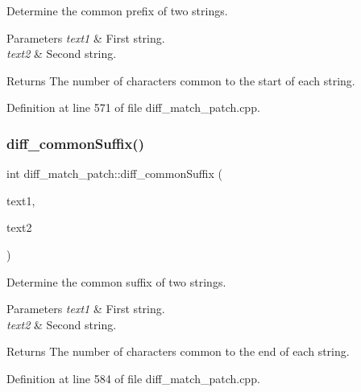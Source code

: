 Determine the common prefix of two strings. 
\begin{DoxyParams}{Parameters}
{\em text1} & First string. \\
\hline
{\em text2} & Second string. \\
\hline
\end{DoxyParams}
\begin{DoxyReturn}{Returns}
The number of characters common to the start of each string. 
\end{DoxyReturn}


Definition at line 571 of file diff\+\_\+match\+\_\+patch.\+cpp.

\mbox{\label{classdiff__match__patch_aed765d65d9e6fb78de3725416a262586}} 
\subsubsection{\texorpdfstring{diff\+\_\+common\+Suffix()}{diff\_commonSuffix()}}
{\footnotesize\ttfamily int diff\+\_\+match\+\_\+patch\+::diff\+\_\+common\+Suffix (\begin{DoxyParamCaption}\item[{const Q\+String \&}]{text1,  }\item[{const Q\+String \&}]{text2 }\end{DoxyParamCaption})}

Determine the common suffix of two strings. 
\begin{DoxyParams}{Parameters}
{\em text1} & First string. \\
\hline
{\em text2} & Second string. \\
\hline
\end{DoxyParams}
\begin{DoxyReturn}{Returns}
The number of characters common to the end of each string. 
\end{DoxyReturn}


Definition at line 584 of file diff\+\_\+match\+\_\+patch.\+cpp.

\mbox{\label{classdiff__match__patch_a70e244439ed3261a2a2c2ce092c45bc0}} 
